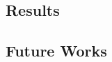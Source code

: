 \documentclass[../Main.tex]{subfiles}
\begin{document}
\subsection{Results}

\subsection{Future Works}


\biblio %
\end{document}
